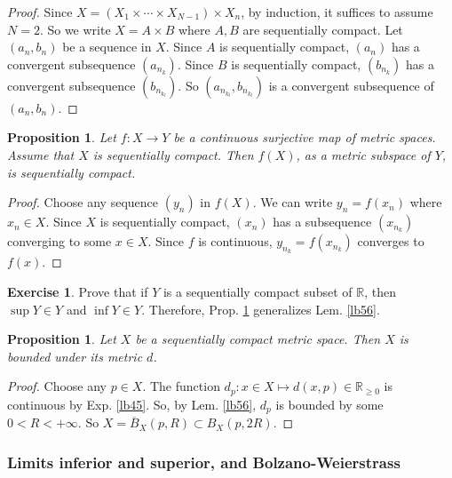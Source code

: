 \documentclass[12pt,b5paper,notitlepage]{article}
\theoremstyle{definition}
\newtheorem{exe}[df]{Exercise}
\theoremstyle{plain}
\newtheorem{pp}[df]{Proposition}
\newcommand{\ovl}{\overline}
\newcommand{\Rbb}{\mathbb R}
\numberwithin{equation}{section}
\begin{document}
\begin{proof}
Since $X=(X_1\times\cdots\times X_{N-1})\times X_n$, by induction, it suffices to assume $N=2$. So we write $X=A\times B$ where $A,B$ are sequentially compact. Let $(a_n,b_n)$ be a sequence in $X$. Since $A$ is sequentially compact, $(a_n)$ has a convergent subsequence $(a_{n_k})$. Since $B$ is sequentially compact, $(b_{n_k})$ has a convergent subsequence $(b_{n_{k_l}})$. So $(a_{n_{k_l}},b_{n_{k_l}})$ is a convergent subsequence of $(a_n,b_n)$.
\end{proof}


\begin{pp}\label{lb62}
Let $f:X\rightarrow Y$ be a continuous surjective map of metric spaces. Assume that $X$ is sequentially compact. Then $f(X)$, as a metric subspace of $Y$, is sequentially compact.
\end{pp}

\begin{proof}
Choose any sequence $(y_n)$ in $f(X)$. We can write $y_n=f(x_n)$ where $x_n\in X$. Since $X$ is sequentially compact, $(x_n)$ has a subsequence $(x_{n_k})$ converging to some $x\in X$. Since $f$ is continuous, $y_{n_k}=f(x_{n_k})$ converges to $f(x)$.
\end{proof}


\begin{exe}\label{lb63}
Prove that if $Y$ is a sequentially compact subset of $\Rbb$, then $\sup Y\in Y$ and $\inf Y\in Y$. Therefore, Prop. \ref{lb62} generalizes Lem. \ref{lb56}.
\end{exe}

\begin{pp}\label{lb71}
Let $X$ be a sequentially compact metric space. Then $X$ is bounded under its metric $d$.
\end{pp}

\begin{proof}
Choose any $p\in X$. The function $d_p:x\in X\mapsto d(x,p)\in\Rbb_{\geq 0}$ is continuous by Exp. \ref{lb45}. So, by Lem. \ref{lb56}, $d_p$ is bounded by some $0<R<+\infty$. So $X=\ovl B_X(p,R)\subset B_X(p,2R)$.
\end{proof} 






\subsubsection{Limits inferior and superior, and Bolzano-Weierstrass}\label{lb69}
\end{document}
